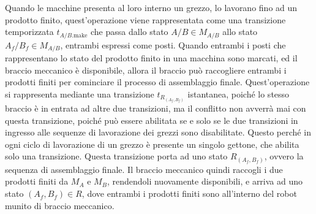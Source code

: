 \documentclass{article}
\numberwithin{equation}{subsection}
\begin{document}
Quando le macchine presenta al loro interno un grezzo, lo lavorano fino ad un prodotto finito, quest'operazione viene rappresentata come una transizione 
temporizzata $t_{A/B.\mathrm{make}}$ che passa dallo stato $A/B\in M_{A/B}$ allo stato $A_f/B_f\in M_{A/B}$, entrambi espressi come posti. Quando entrambi i posti che rappresentano 
lo stato del prodotto finito in una macchina sono marcati, ed il braccio meccanico è disponibile, allora il braccio può raccogliere entrambi i prodotti finiti per cominciare 
il processo di assemblaggio finale. Quest'operazione si rappresenta mediante una transizione $t_{R_{(A_f,B_f)}}$ istantanea, poiché lo stesso braccio è in entrata ad altre due 
transizioni, ma il conflitto non avverrà mai con questa transizione, poiché può essere abilitata se e solo se le due transizioni in ingresso alle sequenze di lavorazione dei 
grezzi sono disabilitate. Questo perché in ogni ciclo di lavorazione di un grezzo è presente un singolo gettone, che abilita solo una transizione. 
Questa transizione porta ad uno stato $R_{(A_f,B_f)}$, ovvero la sequenza di assemblaggio finale. Il braccio meccanico quindi raccogli i due prodotti finiti da $M_A$ e $M_B$, 
rendendoli nuovamente disponibili, e arriva ad uno stato $(A_f,B_f)\in R$, dove entrambi i prodotti finiti sono all'interno del robot munito di braccio meccanico. 
\end{document}
